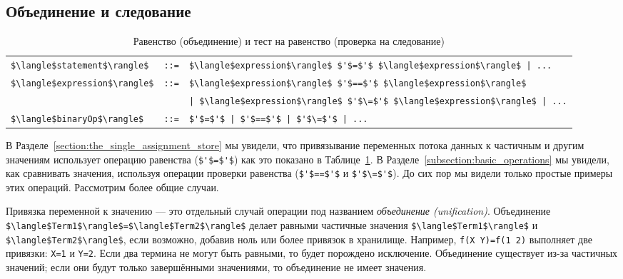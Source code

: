 \subsection{Объединение и следование}\label{subsection:unification_and_entailment}

\begin{table}
  \begin{tabular}{|lrl|}
    \hline
    \lstinline!$\langle$statement$\rangle$! & \lstinline!::=! & \lstinline!$\langle$expression$\rangle$ $'$=$'$ $\langle$expression$\rangle$ | ...! \\
    \lstinline!$\langle$expression$\rangle$! & \lstinline!::=! & \lstinline!$\langle$expression$\rangle$ $'$==$'$ $\langle$expression$\rangle$ ! \\
    & & \lstinline!| $\langle$expression$\rangle$ $'$\=$'$ $\langle$expression$\rangle$ | ...! \\
    \lstinline!$\langle$binaryOp$\rangle$! & \lstinline!::=! & \lstinline!$'$=$'$ | $'$==$'$ | $'$\=$'$ | ...! \\
    \hline
  \end{tabular}
\caption{Равенство (объединение) и тест на равенство (проверка на следование)}
\label{table:equality_and_equality_test}
\end{table}



В Разделе~\ref{section:the_single_assignment_store} мы увидели, что привязывание переменных потока данных к частичным и другим значениям использует операцию равенства (\lstinline!$'$=$'$!) как это показано в Таблице~\ref{table:equality_and_equality_test}. В Разделе~\ref{subsection:basic_operations} мы увидели, как сравнивать значения, используя операции проверки равенства (\lstinline!$'$==$'$! и \lstinline!$'$\=$'$!). До сих пор мы видели только простые примеры этих операций. Рассмотрим более общие случаи.

Привязка переменной к значению --- это отдельный случай операции под названием \emph{объединение (unification)}. Объединение \lstinline!$\langle$Term1$\rangle$=$\langle$Term2$\rangle$! делает равными частичные значения \lstinline!$\langle$Term1$\rangle$! и \lstinline!$\langle$Term2$\rangle$!, если возможно, добавив ноль или более привязок в хранилище. Например, \lstinline!f(X Y)=f(1 2)! выполняет две привязки: \lstinline!X=1! и \lstinline!Y=2!. Если два термина не могут быть равными, то будет порождено исключение. Объединение существует из-за частичных значений; если они будут только завершёнными значениями, то объединение не имеет значения.


